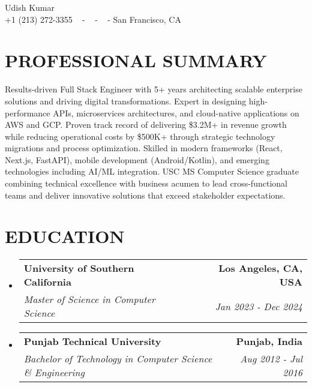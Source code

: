 \documentclass[letterpaper,11pt]{article}
\makeatletter
\newcommand{\resumeSubheading}[4]{
  \vspace{-2pt}\item
    \begin{tabular*}{1.0\textwidth}[t]{l@{\extracolsep{\fill}}r}
      \textbf{\large#1} & \textbf{\small #2} \\
      \textit{\large#3} & \textit{\small #4} \\
      
    \end{tabular*}\vspace{-7pt}
}
\newcommand{\resumeSubHeadingListStart}{\begin{itemize}[leftmargin=0.0in, label={}]}
\newcommand{\resumeSubHeadingListEnd}{\end{itemize}}
\makeatother
\begin{document}


\begin{center}
    {\huge Udish Kumar} \\ \vspace{2pt} 
    {+1 (213) 272-3355} ~ 
    \small{-}
    \href{mailto:udishkum@usc.edu}{\color{blue}{udishkum@usc.edu}} ~ 
    \small{-}
    \href{https://linkedin.com/in/iudishkumar}{ \color{blue}{linkedin.com/in/iudishkumar}}  ~
    \small{-}
    San Francisco, CA ~
    \vspace{-7pt}
\end{center}

\section{\color{airforceblue}PROFESSIONAL SUMMARY}
\justifying
\normalsize{Results-driven Full Stack Engineer with 5+ years architecting scalable enterprise solutions and driving digital transformations. Expert in designing high-performance APIs, microservices architectures, and cloud-native applications on AWS and GCP. Proven track record of delivering \$3.2M+ in revenue growth while reducing operational costs by \$500K+ through strategic technology migrations and process optimization. Skilled in modern frameworks (React, Next.js, FastAPI), mobile development (Android/Kotlin), and emerging technologies including AI/ML integration. USC MS Computer Science graduate combining technical excellence with business acumen to lead cross-functional teams and deliver innovative solutions that exceed stakeholder expectations.}
\raggedright
\vspace{-10pt}

\section{\color{airforceblue}EDUCATION}
  \resumeSubHeadingListStart
    \resumeSubheading
      {University of Southern California}{Los Angeles, CA, USA}
      {Master of Science in Computer Science}{Jan 2023 - Dec 2024}
    \vspace{-4pt}
     \resumeSubheading
      {Punjab Technical University}{Punjab, India}
      {Bachelor of Technology in Computer Science \& Engineering}{Aug 2012 - Jul 2016}
  \resumeSubHeadingListEnd
  \vspace{-10pt}

\end{document}
